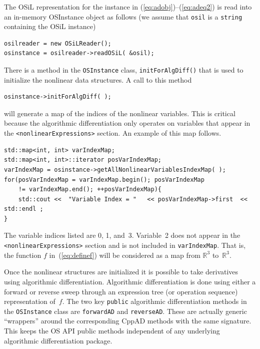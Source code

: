 \documentclass[11pt]{article}
\renewcommand{\_}{{\char"5F}}
\renewcommand{\{}{{\char"7B}}
\renewcommand{\}}{{\char"7D}}
\renewcommand{\^}{{\char"0D}}
\renewcommand{\'}{{\char"0D}}
\begin{document}
\begin{enumerate}[Step 1:]
The OSiL representation for the instance  in  (\ref{eq:adobj})--(\ref{eq:adeq2})  is read into an in-memory
OSInstance object as follows (we assume that {\tt osil} is a {\tt string} containing the OSiL instance)
\begin{verbatim}
osilreader = new OSiLReader();
osinstance = osilreader->readOSiL( &osil);
\end{verbatim}
There is a method in the {\tt OSInstance} class, {\tt initForAlgDiff()} that is used to initialize the nonlinear data structures.  A call to this method
\begin{verbatim}
osinstance->initForAlgDiff( );
\end{verbatim}
will generate a map of the indices of the nonlinear variables. This is critical because the algorithmic differentiation only operates on variables that appear in the {\tt <nonlinearExpressions>} section.  An example of this map follows.
\begin{verbatim}
std::map<int, int> varIndexMap;
std::map<int, int>::iterator posVarIndexMap;
varIndexMap = osinstance->getAllNonlinearVariablesIndexMap( );
for(posVarIndexMap = varIndexMap.begin(); posVarIndexMap
    != varIndexMap.end(); ++posVarIndexMap){
    std::cout <<  "Variable Index = "   << posVarIndexMap->first  << std::endl ;
}
\end{verbatim}
The variable indices listed are 0, 1, and~3. Variable~2 does not appear in the {\tt <nonlinearExpressions>} section and
is not included in {\tt varIndexMap}. That is, the function $f$ in~(\ref{eq:definef}) will be considered as a map from 
$\mathbb{R}^{3}$ to~$\mathbb{R}^{3}$.

Once the nonlinear structures are initialized it is possible to take derivatives using algorithmic differentiation.
Algorithmic differentiation is done using either a forward or reverse sweep through an expression tree (or operation
sequence) representation of~$f$.  The two key {\tt public} algorithmic differentiation  methods in the {\tt OSInstance}%
 class are {\tt forwardAD} and {\tt reverseAD}.
These are actually  generic ``wrappers'' around the corresponding CppAD methods with the same signature.
This keeps the OS API  public methods independent of any underlying algorithmic differentiation package.


\end{enumerate}
\end{document}
